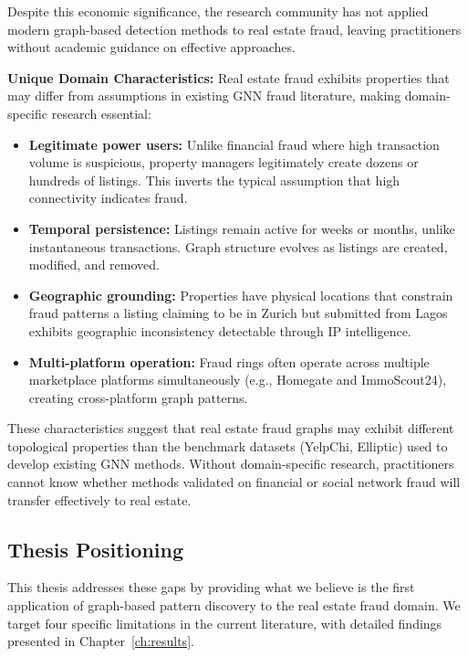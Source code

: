 Despite this economic significance, the research community has not applied modern graph-based detection methods to real estate fraud, leaving practitioners without academic guidance on effective approaches.

\textbf{Unique Domain Characteristics:} Real estate fraud exhibits properties that may differ from assumptions in existing GNN fraud literature, making domain-specific research essential:

\begin{itemize}
    \item \textbf{Legitimate power users:} Unlike financial fraud where high transaction volume is suspicious, property managers legitimately create dozens or hundreds of listings. This inverts the typical assumption that high connectivity indicates fraud.
    
    \item \textbf{Temporal persistence:} Listings remain active for weeks or months, unlike instantaneous transactions. Graph structure evolves as listings are created, modified, and removed.
    
    \item \textbf{Geographic grounding:} Properties have physical locations that constrain fraud patterns a listing claiming to be in Zurich but submitted from Lagos exhibits geographic inconsistency detectable through IP intelligence.
    
    \item \textbf{Multi-platform operation:} Fraud rings often operate across multiple marketplace platforms simultaneously (e.g., Homegate and ImmoScout24), creating cross-platform graph patterns.
\end{itemize}

These characteristics suggest that real estate fraud graphs may exhibit different topological properties than the benchmark datasets (YelpChi, Elliptic) used to develop existing GNN methods. Without domain-specific research, practitioners cannot know whether methods validated on financial or social network fraud will transfer effectively to real estate.

\subsection{Thesis Positioning}

This thesis addresses these gaps by providing what we believe is the first application of graph-based pattern discovery to the real estate fraud domain. We target four specific limitations in the current literature, with detailed findings presented in Chapter~\ref{ch:results}.


